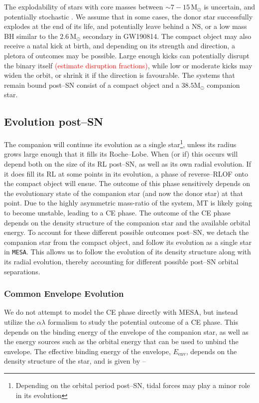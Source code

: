 \documentclass[linenumbers,trackchanges,twocolumn]{aastex701}
\newcommand{\Mdot}{\mathrm{M}_{\odot}}
\newcommand{\red}{\textcolor{red}}
\begin{document}
The explodability of stars with core masses between $\sim 7-15 \, \Mdot$ is uncertain, and potentially stochastic \citep{2025A&A...700A..20M}. We assume that in some cases, the donor star successfully explodes at the end of its life, and potentially leave behind a NS, or a low mass BH similar to the $2.6\,\Mdot$ secondary in GW190814. The compact object may also receive a natal kick at birth, and depending on its strength and direction, a pletora of outcomes may be possible. Large enough kicks can potentially disrupt the binary itself \red{(estimate disruption fractions)}, while low or moderate kicks may widen the orbit, or shrink it if the direction is favourable. The systems that remain bound post--SN consist of a compact object and a $38.5\Mdot$ companion star. 

\subsection{Evolution post--SN}

The companion will continue its evolution as a single star\footnote{Depending on the orbital period post--SN, tidal forces may play a minor role in its evolution}, unless its radius grows large enough that it fills its Roche--Lobe. When (or if) this occurs will depend both on the size of its RL post--SN, as well as its own radial evolution. If it does fill its RL at some points in its evolution, a phase of reverse--RLOF onto the compact object will ensue. The outcome of this phase sensitively depends on the evolutionary state of the companion star (and now the donor star) at that point. Due to the highly asymmetric mass-ratio of the system, MT is likely going to become unstable, leading to a CE phase. The outcome of the CE phase depends on the density structure of the companion star and the available orbital energy. To account for these different possible outcomes post--SN, we detach the companion star from the compact object, and follow its evolution as a single star in \texttt{MESA}. This allows us to follow the evolution of its density structure along with its radial evolution, thereby accounting for different possible post--SN orbital separations.

\subsubsection{Common Envelope Evolution}

We do not attempt to model the CE phase directly with MESA, but instead utilize the $\alpha \lambda$ formalism to study the potential outcome of a CE phase. This depends on the binding energy of the envelope of the companion star, as well as the energy sources such as the orbital energy that can be used to unbind the envelope. The effective binding energy of the envelope, $E_{\text{env}}$, depends on the density structure of the star, and is given by --
\end{document}
